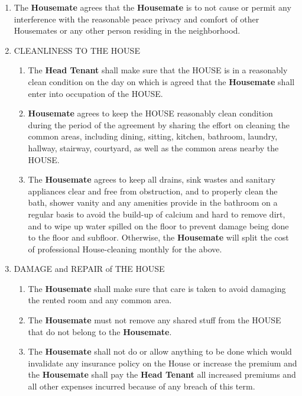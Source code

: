 \documentclass[12pt,a4paper]{article}
\begin{document}
\begin{enumerate}
\item The \textbf{Housemate} agrees that the \textbf{Housemate} is to not cause or permit any interference with the reasonable peace privacy and comfort of other Housemates or any other person residing in the neighborhood.

\item CLEANLINESS TO THE HOUSE
    \begin{enumerate}[label=\alph*.]
    \item The \textbf{Head Tenant} shall make sure that the HOUSE is in a reasonably clean condition on the day on which is agreed that the \textbf{Housemate} shall enter into occupation of the HOUSE.
    
    \item \textbf{Housemate} agrees to keep the HOUSE reasonably clean condition during the period of the agreement by sharing the effort on cleaning the common areas, including dining, sitting, kitchen, bathroom, laundry, hallway, stairway, courtyard, as well as the common areas nearby the HOUSE.
    
    \item The \textbf{Housemate} agrees to keep all drains, sink wastes and sanitary appliances clear and free from obstruction, and to properly clean the bath, shower vanity and any amenities provide in the bathroom on a regular basis to avoid the build-up of calcium and hard to remove dirt, and to wipe up water spilled on the floor to prevent damage being done to the floor and subfloor. Otherwise, the \textbf{Housemate} will split the cost of professional House-cleaning monthly for the above.
    \end{enumerate}

\item DAMAGE and REPAIR of THE HOUSE
    \begin{enumerate}[label=\alph*.]
    \item The \textbf{Housemate} shall make sure that care is taken to avoid damaging the rented room and any common area.
    
    \item The \textbf{Housemate} must not remove any shared stuff from the HOUSE that do not belong to the \textbf{Housemate}.
    
    \item The \textbf{Housemate} shall not do or allow anything to be done which would invalidate any insurance policy on the House or increase the premium and the \textbf{Housemate} shall pay the \textbf{Head Tenant} all increased premiums and all other expenses incurred because of any breach of this term.
    

\end{enumerate}
\end{enumerate}
\end{document}
